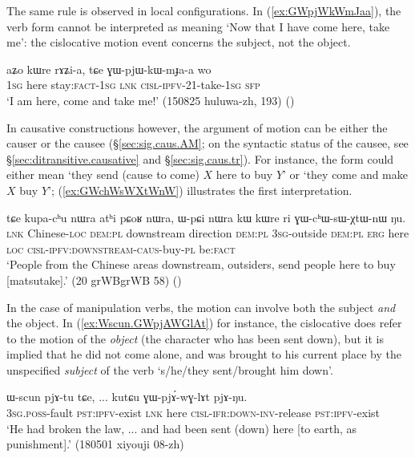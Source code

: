 The same rule is observed in local configurations. In (\ref{ex:GWpjWkWmJaa}), the verb form  cannot be interpreted as meaning `Now that I have come here, take me': the cislocative motion event concerns the subject, not the object.

\begin{exe}
\ex  \label{ex:GWpjWkWmJaa}
 \gll aʑo kɯre rɤʑi-a, tɕe ɣɯ-pjɯ-kɯ-mɟa-a wo \\
 \textsc{1sg} here stay:\textsc{fact}-\textsc{1sg} \textsc{lnk} \textsc{cisl}-\textsc{ipfv}-2\fl{}1-take-\textsc{1sg} \textsc{sfp} \\
 \glt `I am here, come and take me!' (150825 huluwa-zh, 193)
()
\end{exe}

In causative constructions however, the argument of motion can be either the causer  or the causee (§\ref{sec:sig.caus.AM}; on the syntactic status of the causee, see §\ref{sec:ditransitive.causative} and §\ref{sec:sig.caus.tr}). For instance, the form  could either mean `they send (cause to come) $X$ here to buy $Y$' or `they come and make $X$ buy $Y$'; (\ref{ex:GWchWsWXtWnW}) illustrates the first interpretation.

\begin{exe}
\ex \label{ex:GWchWsWXtWnW}
\gll tɕe kupa-cʰu nɯra atʰi pɕoʁ nɯra, ɯ-pɕi nɯra kɯ kɯre ri ɣɯ-cʰɯ-sɯ-χtɯ-nɯ ŋu.  \\
\textsc{lnk} Chinese-\textsc{loc} \textsc{dem}:\textsc{pl} downstream direction \textsc{dem}:\textsc{pl} \textsc{3sg}-outside  \textsc{dem}:\textsc{pl}  \textsc{erg} here \textsc{loc} \textsc{cisl}-\textsc{ipfv}:\textsc{downstream}-\textsc{caus}-buy-\textsc{pl} be:\textsc{fact} \\ 
\glt `People from the Chinese areas downstream, outsiders, send people here to buy [matsutake].' (20 grWBgrWB 58)  ()
\end{exe} 

In the case of manipulation verbs, the motion can involve both the subject \textit{and} the object. In (\ref{ex:Wscun.GWpjAWGlAt}) for instance, the cislocative does refer to the motion of the \textit{object} (the character who has been sent down), but it is implied that he did not come alone, and was brought to his current place by the unspecified \textit{subject} of the verb  `s/he/they sent/brought him down'.

\begin{exe}
	\ex \label{ex:Wscun.GWpjAWGlAt}
	\gll ɯ-scun pjɤ-tu tɕe,  ... kutɕu ɣɯ-pjɤ́-wɣ-lɤt pjɤ-ŋu.  \\
	\textsc{3sg}.\textsc{poss}-fault \textsc{pst}:\textsc{ipfv}-exist \textsc{lnk} { } here  \textsc{cisl}-\textsc{ifr}:\textsc{down}-\textsc{inv}-release \textsc{pst}:\textsc{ipfv}-exist \\ 
	\glt `He had broken the law, ... and had been sent (down) here [to earth, as punishment].' (180501 xiyouji 08-zh) 
\end{exe} 

